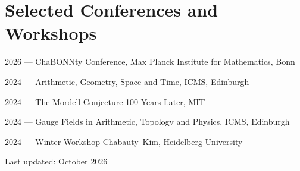 \documentclass[11pt,a4paper]{article}
\begin{document}
\section*{Selected Conferences and Workshops}
\begin{cvlist}
  \item 2026 --- ChaBONNty Conference, Max Planck Institute for Mathematics, Bonn
  \item 2024 --- Arithmetic, Geometry, Space and Time, ICMS, Edinburgh
  \item 2024 --- The Mordell Conjecture 100 Years Later, MIT
  \item 2024 --- Gauge Fields in Arithmetic, Topology and Physics, ICMS, Edinburgh
  \item 2024 --- Winter Workshop Chabauty--Kim, Heidelberg University
\end{cvlist}

\vfill
\begin{center}
  \small Last updated: October 2026
\end{center}
\end{document}
